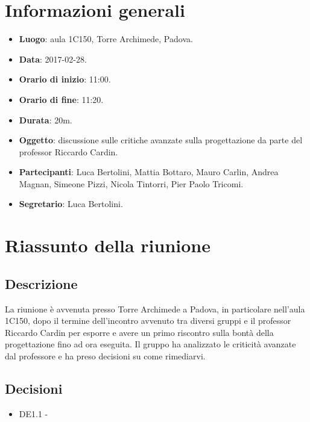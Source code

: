 \documentclass[a4paper,titlepage]{article}
\begin{document}
\maketitle
\begin{diario}
\end{diario}
\newpage
\tableofcontents

\newpage
\section{Informazioni generali}
\label{sec:Informazioni}

\begin{itemize}
  \item \textbf{Luogo}: aula 1C150, Torre Archimede, Padova.
  \item \textbf{Data}: 2017-02-28.
  \item \textbf{Orario di inizio}: 11:00.
  \item \textbf{Orario di fine}: 11:20.
  \item \textbf{Durata}: 20m.
  \item \textbf{Oggetto}: discussione sulle critiche avanzate sulla progettazione da parte del professor Riccardo Cardin.
  \item \textbf{Partecipanti}: Luca Bertolini, Mattia Bottaro, Mauro Carlin, Andrea Magnan, Simeone Pizzi, Nicola Tintorri, Pier Paolo Tricomi.
  \item \textbf{Segretario}: Luca Bertolini.

\end{itemize}
\section{Riassunto della riunione}
\label{sec:RiassuntoRiunione}
 \subsection{Descrizione}
La riunione è avvenuta presso Torre Archimede a Padova, in particolare nell'aula 1C150, dopo il termine dell'incontro avvenuto tra diversi gruppi e il professor Riccardo Cardin per esporre e avere un primo riscontro sulla bontà della progettazione fino ad ora eseguita. Il gruppo \GRUPPO{} ha analizzato le criticità avanzate dal professore e ha preso decisioni su come rimediarvi.
 \subsection{Decisioni}
 \begin{itemize}
  \item DE1.1 - 
 \end{itemize}
\end{document}

